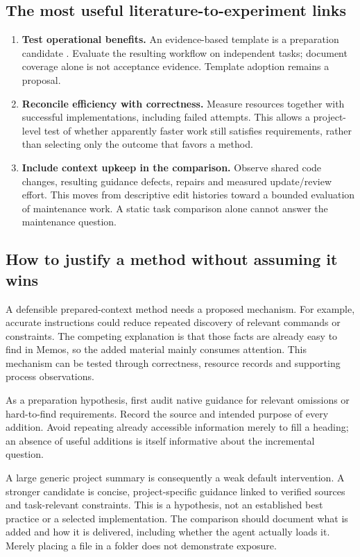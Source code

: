 \subsection{The most useful literature-to-experiment links}
\begin{enumerate}
\item \textbf{Test operational benefits.}
An evidence-based template is a preparation candidate \citep{shanto2026}.
Evaluate the resulting workflow on independent tasks; document coverage alone
is not acceptance evidence. Template adoption remains a proposal.
\item \textbf{Reconcile efficiency with correctness.}
Measure resources together with successful implementations, including failed
attempts. This allows a project-level test of whether apparently faster work
still satisfies requirements, rather than selecting only the outcome that
favors a method.
\item \textbf{Include context upkeep in the comparison.}
Observe shared code changes, resulting guidance defects, repairs and measured
update/review effort. This moves from descriptive edit histories toward a
bounded evaluation of maintenance work. A static task comparison alone cannot
answer the maintenance question.
\end{enumerate}

\subsection{How to justify a method without assuming it wins}
A defensible prepared-context method needs a proposed mechanism. For example,
accurate instructions could reduce repeated discovery of relevant commands or
constraints. The competing explanation is that those facts are already easy
to find in Memos, so the added material mainly consumes attention. This
mechanism can be tested through correctness, resource records and supporting
process observations.

As a preparation hypothesis, first audit native guidance for relevant omissions
or hard-to-find requirements. Record the source and intended purpose of every
addition. Avoid repeating already accessible information merely to fill a
heading; an absence of useful additions is itself informative about the
incremental question.

A large generic project summary is consequently a weak default intervention.
A stronger candidate is concise, project-specific guidance linked to verified
sources and task-relevant constraints. This is a hypothesis, not an established
best practice or a selected implementation. The comparison should document
what is added and how it is delivered, including whether the agent actually
loads it. Merely placing a file in a folder does not demonstrate exposure.

